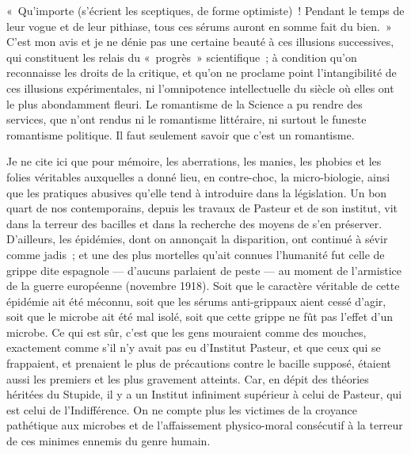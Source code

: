 \documentclass[french,twoside]{book} %
\begin{document}
« Qu’importe (s’écrient les sceptiques, de forme optimiste) ! Pendant le temps de leur vogue et de leur pithiase, tous ces sérums auront en somme fait du bien. » C’est mon avis et je ne dénie pas une certaine beauté à ces illusions successives, qui constituent les relais du « progrès » scientifique ; à condition qu’on reconnaisse les droits de la critique, et qu’on ne proclame point l’intangibilité de ces illusions expérimentales, ni l’omnipotence intellectuelle du siècle où elles ont le plus abondamment fleuri. Le romantisme de la Science a pu rendre des services, que n’ont rendus ni le romantisme littéraire, ni surtout le funeste romantisme politique. Il faut seulement savoir que c’est un romantisme.\par
Je ne cite ici que pour mémoire, les aberrations, les manies, les phobies et les folies véritables auxquelles a donné lieu, en contre-choc, la micro-biologie, ainsi que les pratiques abusives qu’elle tend à introduire dans la législation. Un bon quart de nos contemporains, depuis les travaux de Pasteur et de son institut, vit dans la terreur des bacilles et dans la recherche des moyens de s’en préserver. D’ailleurs, les épidémies, dont on annonçait la disparition, ont continué à sévir comme jadis ; et une des plus mortelles qu’ait connues l’humanité fut celle de grippe dite espagnole — d’aucuns parlaient de peste — au moment de l’armistice de la guerre européenne (novembre 1918). Soit que le caractère véritable de cette épidémie ait été méconnu, soit que les sérums anti-grippaux aient cessé d’agir, soit que le microbe ait été mal isolé, soit que cette grippe ne fût pas l’effet d’un microbe. Ce qui est sûr, c’est que les gens mouraient comme des mouches, exactement comme s’il n’y avait pas eu d’Institut Pasteur, et que ceux qui se frappaient, et prenaient le plus de précautions contre le bacille supposé, étaient aussi les premiers et les plus gravement atteints. Car, en dépit des théories héritées du Stupide, il y a un Institut infiniment supérieur à celui de Pasteur, qui est celui de l’Indifférence. On ne compte plus les victimes de la croyance pathétique aux microbes et de l’affaissement physico-moral consécutif à la terreur de ces minimes ennemis du genre humain.\par
\end{document}
